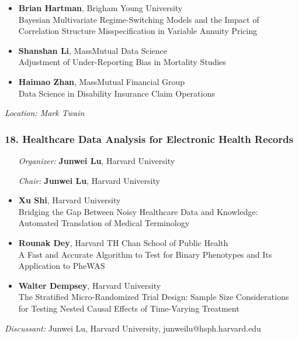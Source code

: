 \begin{itemize}
\item \textbf{Brian Hartman}, Brigham Young University \\
Bayesian Multivariate Regime-Switching Models and the Impact of Correlation Structure Misspecification in Variable Annuity Pricing
\item \textbf{Shanshan Li}, MassMutual Data Science \\
Adjustment of Under-Reporting Bias in Mortality Studies
\item \textbf{Haimao Zhan}, MassMutual Financial Group \\
Data Science in Disability Insurance Claim Operations
\end{itemize}

\emph{Location: Mark Twain}

\subsubsection*{18. Healthcare Data Analysis for Electronic Health Records}

\begin{enumerate}[align=left]
\item [\emph{Organizer:}] \textbf{Junwei Lu}, Harvard University
\item [\emph{Chair:}] \textbf{Junwei Lu}, Harvard University
\end{enumerate}

\begin{itemize}
\item \textbf{Xu Shi}, Harvard University \\
Bridging the Gap Between Noisy Healthcare Data and Knowledge: Automated Translation of Medical Terminology
\item \textbf{Rounak Dey}, Harvard TH Chan School of Public Health \\
A Fast and Accurate Algorithm to Test for Binary Phenotypes and Its Application to PheWAS
\item \textbf{Walter Dempsey}, Harvard University \\
The Stratified Micro-Randomized Trial Design:  Sample Size Considerations for Testing Nested Causal Effects of Time-Varying Treatment
\end{itemize}

\emph{Discussant:} Junwei Lu, Harvard University, junweilu@hsph.harvard.edu

